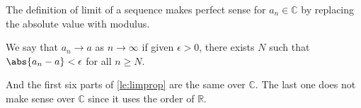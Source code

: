 \begin{remark}
    The definition of limit of a sequence makes perfect sense for \(a_n \in \mathbb{C}\) by replacing the absolute value with modulus.

    \begin{definition}{}{}
    We say that \(a_n \to a\) as \(n \to \infty\) if given \(\epsilon > 0\), there exists \(N\) such that \(\abs{a_{n}-a} < \epsilon \) for all \(n \geq N\).
    \end{definition}

    And the first six parts of \cref{le:limprop} are the same over \(\mathbb{C}\). The last one does not make sense over \(\mathbb{C}\) since it uses the order of \(\mathbb{R}\).
\end{remark}